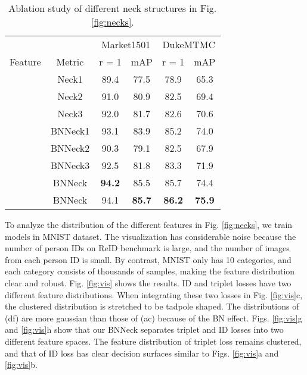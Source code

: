 \documentclass[journal]{IEEEtran}
\begin{document}
\renewcommand{\multirowsetup}{\centering}
\begin{table}[tb]\small
  \begin{center}
  \begin{tabular}{ c|c|cc|cc}
\hline
    		&		       & \multicolumn{2}{c|}{Market1501} & \multicolumn{2}{c}{DukeMTMC}	 \\
  Feature   & Metric	   & r = 1 	& mAP  &r = 1 & mAP \\
 	\hline
	\hline
         & Neck1         &89.4	&77.5	&78.9	&65.3 \\
         & Neck2         &91.0	&80.9	&82.5	&69.4		\\
         & Neck3         &92.0	&81.7	&82.6	&70.6		\\
       & BNNeck1	    &93.1	&83.9	&85.2	&74.0       \\
       & BNNeck2	    &90.3	&79.1	&82.5	&67.9       \\
       & BNNeck3	    &92.5	&81.8	&83.3	&71.9       \\
       & BNNeck        &\textbf{94.2}&85.5 &85.7 &74.4		\\
       & BNNeck        &94.1	&\textbf{85.7} &\textbf{86.2}	&\textbf{75.9}		\\
\hline
  \end{tabular}
  \end{center}
  \caption{\label{tab:necks}Ablation study of different neck structures in Fig. \ref{fig:necks}.}
  \vspace{-2mm}
\end{table}

To analyze the distribution of the different features in Fig. \ref{fig:necks}, we train models in MNIST dataset. The visualization has considerable noise because the number of person IDs on ReID benchmark is large, and the number of images from each person ID is small. By contrast, MNIST only has 10 categories, and each category consists of thousands of samples, making the feature distribution clear and robust. Fig. \ref{fig:vis} shows the results. ID and triplet losses have two different feature distributions. When integrating these two losses in Fig. \ref{fig:vis}c, the clustered distribution is stretched to be tadpole shaped. The distributions of (df) are more gaussian than those of (ac) because of the BN effect. Figs. \ref{fig:vis}g and \ref{fig:vis}h show that our BNNeck separates triplet and ID losses into two different feature spaces. The feature distribution of triplet loss remains clustered, and that of ID loss has clear decision surfaces similar to Figs. \ref{fig:vis}a and \ref{fig:vis}b.
\end{document}
